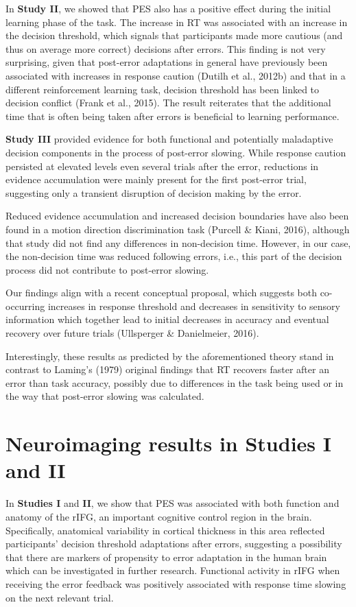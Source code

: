 \documentclass[12pt,openany]{book}
\theoremstyle{definition}
\theoremstyle{definition}
\theoremstyle{definition}
\theoremstyle{remark}
\begin{document}
In \textbf{Study II}, we showed that PES also has a positive effect
during the initial learning phase of the task. The increase in RT was
associated with an increase in the decision threshold, which signals
that participants made more cautious (and thus on average more correct)
decisions after errors. This finding is not very surprising, given that
post-error adaptations in general have previously been associated with
increases in response caution (Dutilh et al., 2012b) and that in a
different reinforcement learning task, decision threshold has been
linked to decision conflict (Frank et al., 2015). The result reiterates
that the additional time that is often being taken after errors is
beneficial to learning performance.

\textbf{Study III} provided evidence for both functional and potentially
maladaptive decision components in the process of post-error slowing.
While response caution persisted at elevated levels even several trials
after the error, reductions in evidence accumulation were mainly present
for the first post-error trial, suggesting only a transient disruption
of decision making by the error.

Reduced evidence accumulation and increased decision boundaries have
also been found in a motion direction discrimination task (Purcell \&
Kiani, 2016), although that study did not find any differences in
non-decision time. However, in our case, the non-decision time was
reduced following errors, i.e., this part of the decision process did
not contribute to post-error slowing.

Our findings align with a recent conceptual proposal, which suggests
both co-occurring increases in response threshold and decreases in
sensitivity to sensory information which together lead to initial
decreases in accuracy and eventual recovery over future trials
(Ullsperger \& Danielmeier, 2016).

Interestingly, these results as predicted by the aforementioned theory
stand in contrast to Laming's (1979) original findings that RT recovers
faster after an error than task accuracy, possibly due to differences in
the task being used or in the way that post-error slowing was
calculated.

\section{Neuroimaging results in Studies I and
II}\label{neuroimaging-results-in-studies-i-and-ii}

In \textbf{Studies I} and \textbf{II}, we show that PES was associated
with both function and anatomy of the rIFG, an important cognitive
control region in the brain. Specifically, anatomical variability in
cortical thickness in this area reflected participants' decision
threshold adaptations after errors, suggesting a possibility that there
are markers of propensity to error adaptation in the human brain which
can be investigated in further research. Functional activity in rIFG
when receiving the error feedback was positively associated with
response time slowing on the next relevant trial.
\end{document}
